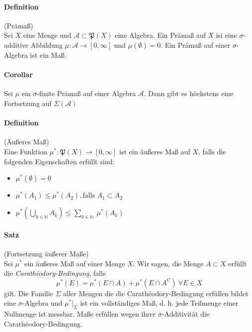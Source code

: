 \documentclass[12pt,a4paper,fleqn]{article}
\begin{document}
\paragraph{Definition} (Prämaß)\\
Sei $X$ eine Menge und $\mathcal{A} \subset \mathfrak{P}(X)$ eine Algebra. Ein Prämaß auf $X$ isi eine $\sigma$-additive Abbildung $\mu\colon\mathcal{A} \rightarrow [0, \infty]$ und $\mu(\emptyset) = 0$. Ein Prämaß auf einer $\sigma$-Algebra ist ein Maß.

\paragraph{Corollar} Sei $\mu$ ein $\sigma$-finite Prämaß auf einer Algebra $\mathcal{A}$. Dann gibt es höchstens eine Fortsetzung auf $\Sigma(\mathcal{A})$

\paragraph{Definition} (Äußeres Maß)\\
Eine Funktion $\mu^*\colon \mathfrak{P}(X) \rightarrow [0, \infty]$ ist ein äußeres Maß auf $X$, falls die folgenden Eigenschaften erfüllt sind:
\begin{itemize}
\item$\mu^*(\emptyset) = 0$
\item$\mu^*(A_1) \leq \mu^*(A_2), \text{falls } A_1 \subset A_2$
\item$\mu^*(\bigcup_{k \in \mathbb{N}}A_k) \leq \sum_{k \in \mathbb{N}}\ \mu^*(A_k)$
\end{itemize}

\paragraph{Satz} (Fortsetzung äußerer Maße)\\
Sei $\mu^*$ ein äußeres Maß auf einer Menge $X$. Wir sagen, die Menge $A \subset X$ erfüllt die \textit{Carathéodory-Bedingung}, falls 
\begin{displaymath}
\mu^*(E) = \mu^*(E\cap A) + \mu^*(E \cap A^\mathrm{C})\ \forall E \in X
\end{displaymath}
gilt. Die Familie $\Sigma$ aller Mengen die die Carathéodory-Bedingung erfüllen bildet eine $\sigma$-Algebra und $\mu^*\vert_\Sigma$ ist ein vollständiges Maß, d. h. jede Teilmenge einer Nullmenge ist messbar. Maße erfüllen wegen ihrer $\sigma$-Additivität die Carathéodory-Bedingung.
\end{document}
